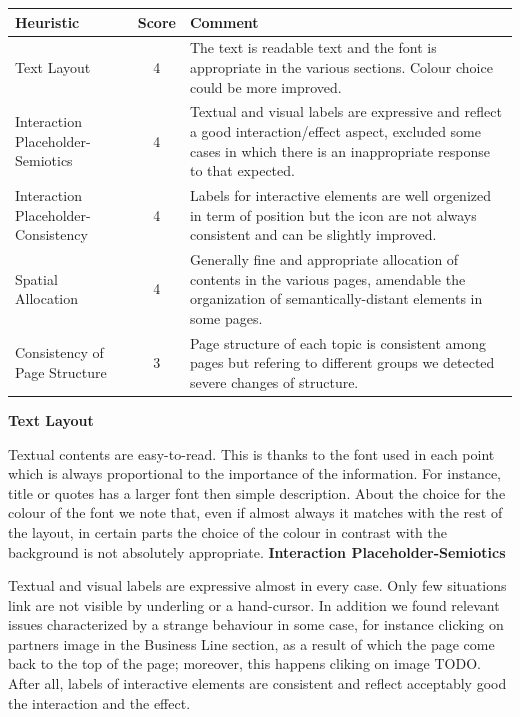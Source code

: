 \begin{table}[H]
  \begin{center}
    \label{tab:table1}
    \begin{tabular}{||l|c|p{8cm}||} %
      \textbf{Heuristic} & \textbf{Score} & \textbf{Comment}\\
      
      \hline
      Text Layout & 4 & The text is readable text and the font is appropriate in the various sections. Colour choice could be more improved.\\
      \hline
      Interaction Placeholder-Semiotics & 4 & Textual and visual labels are expressive and reflect a good interaction/effect aspect, excluded some cases in which there is an inappropriate response to that expected.\\
      \hline
      Interaction Placeholder-Consistency & 4 & Labels for interactive elements are well orgenized in term of position but the icon are not always consistent and can be slightly improved.\\
      \hline
      Spatial Allocation & 4 & Generally fine and appropriate allocation of contents in the various pages, amendable the organization of semantically-distant elements in some pages.\\
      \hline
      Consistency of Page Structure & 3 & Page structure of each topic is consistent among pages but refering to different groups we detected severe changes of structure.\\

    \end{tabular}
  \end{center}
\end{table}
\medskip
\textbf{Text Layout}\par
Textual contents are easy-to-read. This is thanks to the font used in each point which is always proportional to the importance of the information. For instance, title or quotes has a larger font then simple description. About the choice for the colour of the font we note that, even if almost always it matches with the rest of the layout, in certain parts the choice of the colour in contrast with the background is not absolutely appropriate.
\medskip
\textbf{Interaction Placeholder-Semiotics}\par
Textual and visual labels are expressive almost in every case. Only few situations link are not visible by underling or a hand-cursor. In addition we found relevant issues characterized by a strange behaviour in some case, for instance clicking on partners image in the Business Line section, as a result of which the page come back to the top of the page; moreover, this happens cliking on image TODO. After all, labels of interactive elements are consistent and reflect acceptably good the interaction and the effect.\\
